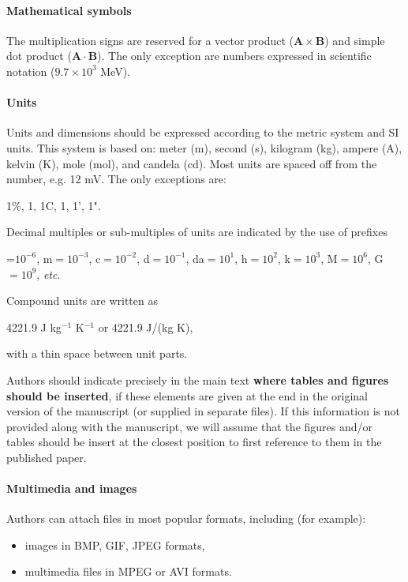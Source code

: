 \documentclass[USenglish,oneside,twocolumn]{article}
\begin{document}
\paragraph{Mathematical symbols}
    The multiplication signs are reserved for a vector product ($\mathbf{A}\times\mathbf{B}$) and simple dot product ($\mathbf{A}\cdot\mathbf{B}$). The only exception are numbers expressed in scientific notation ($9.7\times 10^3$ MeV).


\paragraph{Units}
    Units and dimensions should be expressed according to the metric system and SI units. This system is based on: meter (m), second (s), kilogram (kg), ampere (A), kelvin (K), mole (mol), and candela (cd). Most units are spaced off from the number, e.g. 12 mV. The only exceptions are:
\begin{center}
    1\%, 1\textperthousand, 1\textdegree C, 1\textdegree, 1', 1".
\end{center}

    Decimal multiples or sub-multiples of units are indicated by the use of prefixes

\begin{center}
    \textmu=$10^{-6}$, m$=10^{-3}$, c$=10^{-2}$, d$=10^{-1}$,
    da$=10^1$, h$=10^2$, k$=10^3$, M$=10^6$, G$=10^9$, {\em etc}.
\end{center}

    Compound units are written as
\begin{center}
    4221.9 J kg$^{-1}$ K$^{-1}$ or 4221.9 J/(kg K),
\end{center}
    with a thin space between unit parts.


    Authors should indicate precisely in the main text {\bf where tables and figures should be inserted}, if these elements are given at the end in the original version of the manuscript (or supplied in separate files).
    If this information is not provided along with the manuscript, we will assume that the figures and/or tables should be insert at the closest position to first reference to them in the published paper.

\paragraph{Multimedia and images}
    Authors can attach files in most popular formats, including (for example):
\begin{itemize}
\item images in BMP, GIF, JPEG formats,
\item multimedia files in MPEG or AVI formats.
\end{itemize}
\end{document}

